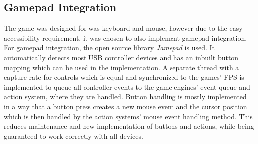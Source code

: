 \subsection{Gamepad Integration}\label{subsec:gamepad-integration}
The game was designed for was keyboard and mouse, however due to the easy accessibility requirement, it was chosen to also implement gamepad integration.
For gamepad integration, the open source library \textit{Jamepad} is used.
It automatically detects most USB controller devices and has an inbuilt button mapping which can be used in the implementation.
A separate thread with a capture rate for controls which is equal and synchronized to the games' FPS is implemented to queue all controller
events to the game engines' event queue and action system, where they are handled.
Button handling is mostly implemented in a way that a button press creates a new mouse event and the cursor position which is then handled by the action
systems' mouse event handling method.
This reduces maintenance and new implementation of buttons and actions, while being guaranteed to work correctly with all devices.


